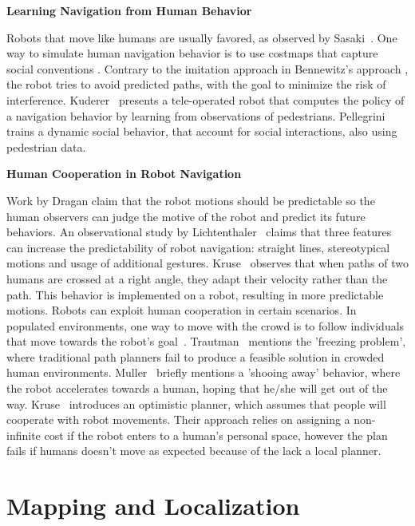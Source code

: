 \textbf{Learning Navigation from Human Behavior}

Robots that move like humans are usually favored, as observed by Sasaki~\cite{sasaki2006human}. One way to simulate human navigation behavior is to use costmaps that capture social conventions \cite{scandolo2011anthropomorphic,luber2012socially}. Contrary to the imitation approach in Bennewitz's approach \cite{bennewitz2005learning}, the robot tries to avoid predicted paths, with the goal to minimize the risk of interference. Kuderer~\cite{kuderer2013teaching} presents a tele-operated robot that computes the policy of a navigation behavior by learning from observations of pedestrians. Pellegrini~\cite{pellegrini2009you} trains a dynamic social behavior, that account for social interactions, also using pedestrian data.

\textbf{Human Cooperation in Robot Navigation}

Work by Dragan \cite{dragan2013legibility} claim that the robot motions should be predictable so the human observers can judge the motive of the robot and predict its future behaviors. An observational study by Lichtenthaler~\cite{lichtenthaler2013towards} claims that three features can increase the predictability of robot navigation: straight lines, stereotypical motions and usage of additional gestures. Kruse~\cite{kruse2012legible} observes that when paths of two humans are crossed at a right angle, they adapt their velocity rather than the path. This behavior is implemented on a robot, resulting in more predictable motions. Robots can exploit human cooperation in certain scenarios. In populated environments, one way to move with the crowd is to follow individuals that move towards the robot's goal~\cite{stein2012robot,muller2008socially}. Trautman~\cite{trautman2010unfreezing} mentions the 'freezing problem', where traditional path planners fail to produce a feasible solution in crowded human environments. Muller~\cite{muller2008socially} briefly mentions a 'shooing away' behavior, where the robot accelerates towards a human, hoping that he/she will get out of the way. Kruse~\cite{kruse2010exploiting} introduces an optimistic planner, which assumes that people will cooperate with robot movements. Their approach relies on assigning a non-infinite cost if the robot enters to a human's personal space, however the plan fails if humans doesn't move as expected because of the lack a local planner.

\section{Mapping and Localization}
\label{sec:mapping_localization}

